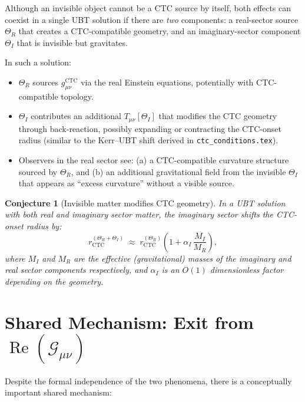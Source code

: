 \documentclass[12pt]{article}
\newtheorem{conjecture}{Conjecture}
\begin{document}
Although an invisible object cannot be a CTC source by itself,
both effects can coexist in a single UBT solution if there are
\emph{two} components: a real-sector source $\Theta_R$ that creates
a CTC-compatible geometry, and an imaginary-sector component $\Theta_I$
that is invisible but gravitates.

In such a solution:
\begin{itemize}
  \item $\Theta_R$ sources $g_{\mu\nu}^{\mathrm{CTC}}$ via the real
    Einstein equations, potentially with CTC-compatible topology.
  \item $\Theta_I$ contributes an additional
    $T_{\mu\nu}[\Theta_I]$ that modifies the CTC geometry through
    back-reaction, possibly expanding or contracting the
    CTC-onset radius (similar to the Kerr–UBT shift derived in
    \texttt{ctc\_conditions.tex}).
  \item Observers in the real sector see: (a) a CTC-compatible
    curvature structure sourced by $\Theta_R$, and (b) an
    additional gravitational field from the invisible $\Theta_I$
    that appears as ``excess curvature'' without a visible source.
\end{itemize}

\begin{conjecture}[Invisible matter modifies CTC geometry]
\label{conj:invisible_ctc}
In a UBT solution with both real and imaginary sector matter,
the imaginary sector shifts the CTC-onset radius by:
\begin{equation}
  r_\mathrm{CTC}^{(\Theta_R + \Theta_I)}
  \;\approx\; r_\mathrm{CTC}^{(\Theta_R)}\left(
    1 + \alpha_I\,\frac{M_I}{M_R}
  \right),
\end{equation}
where $M_I$ and $M_R$ are the effective (gravitational) masses of
the imaginary and real sector components respectively, and $\alpha_I$
is an $O(1)$ dimensionless factor depending on the geometry.
\end{conjecture}

\section{Shared Mechanism: Exit from $\operatorname{Re}(\mathcal{G}_{\mu\nu})$}

Despite the formal independence of the two phenomena, there is a
conceptually important shared mechanism:
\end{document}
